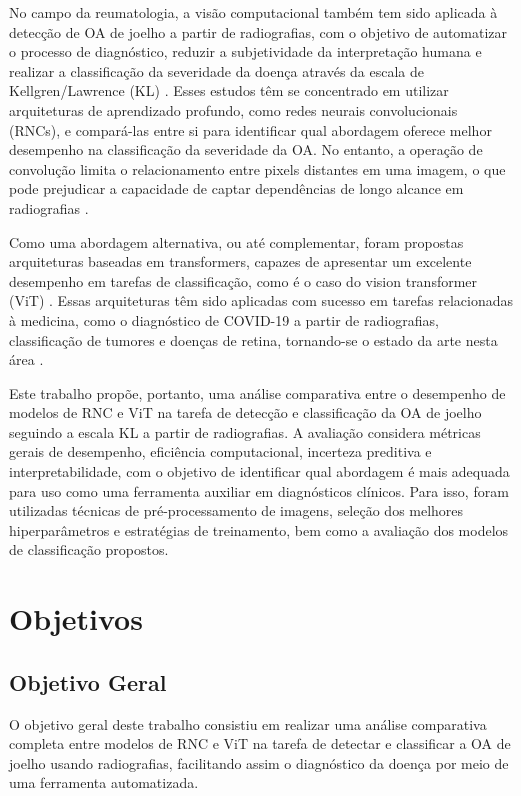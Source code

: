 No campo da reumatologia, a visão computacional também tem sido aplicada à detecção de OA de joelho a partir de radiografias, com o objetivo de automatizar o processo de diagnóstico, reduzir a subjetividade da interpretação humana e realizar a classificação da severidade da doença através da escala de Kellgren/Lawrence (KL) \cite{Mohammed2023}. Esses estudos têm se concentrado em utilizar arquiteturas de aprendizado profundo, como redes neurais convolucionais (RNCs), e compará-las entre si para identificar qual abordagem oferece melhor desempenho na classificação da severidade da OA. No entanto, a operação de convolução limita o relacionamento entre pixels distantes em uma imagem, o que pode prejudicar a capacidade de captar dependências de longo alcance em radiografias \cite{Shamshad2023}.

Como uma abordagem alternativa, ou até complementar, foram propostas arquiteturas baseadas em transformers, capazes de apresentar um excelente desempenho em tarefas de classificação, como é o caso do vision transformer (ViT) \cite{Dosovitskiy2021}. Essas arquiteturas têm sido aplicadas com sucesso em tarefas relacionadas à medicina, como o diagnóstico de COVID-19 a partir de radiografias, classificação de tumores e doenças de retina, tornando-se o estado da arte nesta área \cite{Shamshad2023}.

Este trabalho propõe, portanto, uma análise comparativa entre o desempenho de modelos de RNC e ViT na tarefa de detecção e classificação da OA de joelho seguindo a escala KL a partir de radiografias. A avaliação considera métricas gerais de desempenho, eficiência computacional, incerteza preditiva e interpretabilidade, com o objetivo de identificar qual abordagem é mais adequada para uso como uma ferramenta auxiliar em diagnósticos clínicos. Para isso, foram utilizadas técnicas de pré-processamento de imagens, seleção dos melhores hiperparâmetros e estratégias de treinamento, bem como a avaliação dos modelos de classificação propostos.

\section{Objetivos}

\subsection{Objetivo Geral}

O objetivo geral deste trabalho consistiu em realizar uma análise comparativa completa entre modelos de RNC e ViT na tarefa de detectar e classificar a OA de joelho usando radiografias, facilitando assim o diagnóstico da doença por meio de uma ferramenta automatizada.


